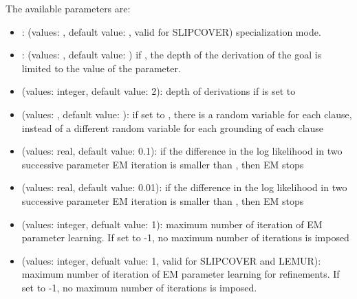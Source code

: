 \documentclass[letterpaper,10pt,english]{sphinxmanual}
\begin{document}
The available parameters are:
\begin{itemize}
\item {} 
: (values: , default value: , valid for SLIPCOVER) specialization mode.

\item {} 
: (values: , default value: ) if , the depth of the derivation of the goal is limited to the value of the  parameter.

\item {} 
 (values: integer, default value: 2): depth of derivations if  is set to 

\item {} 
 (values: , default value: ): if set to , there is a random variable for each clause, instead of a different random variable for each grounding of each clause

\item {} 
 (values: real, default value: 0.1): if the difference in the log likelihood in two successive parameter EM iteration is smaller than , then EM stops

\item {} 
 (values: real, default value: 0.01): if the difference in the log likelihood in two successive parameter EM iteration is smaller than , then EM stops

\item {} 
 (values: integer, defualt value: 1): maximum number of iteration of EM parameter learning. If set to -1, no maximum number of iterations is imposed

\item {} 
 (values: integer, defualt value: 1, valid for SLIPCOVER and LEMUR): maximum number of iteration of EM parameter learning for refinements. If set to -1, no maximum number of iterations is imposed.


\end{itemize}
\end{document}
